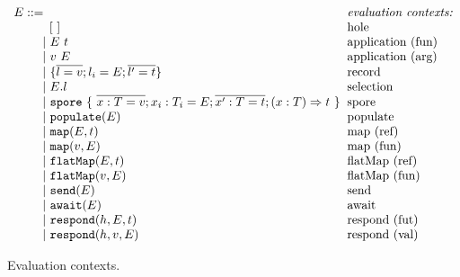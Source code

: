 \begin{figure}
\centering
 $\ba[t]{l@{\hspace{2mm}}l}
E ::=                                                                                                     & \mbox{\it{evaluation contexts:}} \\
\gap \:\:\:\: [~]                                                                                         & \mbox{hole} \\
\gap ~|~  E~t                                                                                             & \mbox{application (fun)} \\
\gap ~|~  v~E                                                                                             & \mbox{application (arg)} \\
\gap ~|~  \{ \seq{l = v} ; l_i = E ; \seq{l' = t} \}                                                      & \mbox{record} \\
\gap ~|~  E.l                                                                                             & \mbox{selection} \\
\gap ~|~  \texttt{spore}~\{~\seq{x : T = v} ; x_i : T_i = E ; \seq{x' : T = t} ; (x: T) \Rightarrow t~\}  & \mbox{spore} \\
\gap ~|~  \texttt{populate}(E)                                                                            & \mbox{populate} \\
\gap ~|~  \texttt{map}(E, t)                                                                              & \mbox{map (ref)} \\
\gap ~|~  \texttt{map}(v, E)                                                                              & \mbox{map (fun)} \\
\gap ~|~  \texttt{flatMap}(E, t)                                                                          & \mbox{flatMap (ref)} \\
\gap ~|~  \texttt{flatMap}(v, E)                                                                          & \mbox{flatMap (fun)} \\
\gap ~|~  \texttt{send}(E)                                                                                & \mbox{send} \\
\gap ~|~  \texttt{await}(E)                                                                               & \mbox{await} \\
\gap ~|~  \texttt{respond}(h, E, t)                                                                       & \mbox{respond (fut)} \\
\gap ~|~  \texttt{respond}(h, v, E)                                                                       & \mbox{respond (val)} \\
\ea$
\caption{Evaluation contexts.}\label{fig:eval-ctx}
\end{figure}

